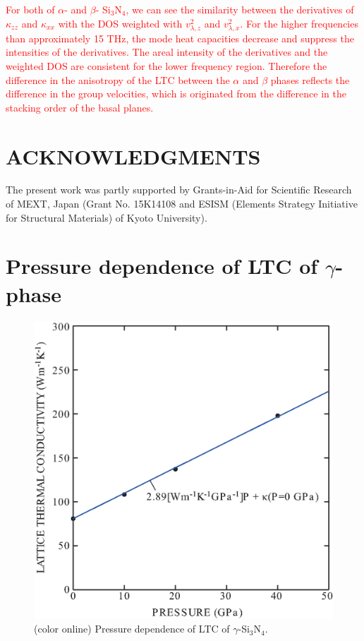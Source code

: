 \documentclass[twocolumn,amsmath,amssymb,a4paper,prb,superscriptaddress,floatfix]{revtex4-1}
\begin{document}
\textcolor{red}{For both of $\alpha$- and $\beta$- Si$_3$N$_4$, we can
see the similarity between the derivatives of $\kappa_{zz}$ and
$\kappa_{xx}$ with the DOS weighted with $v_{\lambda,z}^2$ and
$v_{\lambda,x}^2$. For the higher frequencies than approximately 15 THz,
the mode heat capacities decrease and suppress the intensities of the
derivatives. The areal intensity of the derivatives and the weighted DOS
are consistent for the lower frequency region. Therefore the difference
in the anisotropy of the LTC between the $\alpha$ and $\beta$ phases
reflects the difference in the group velocities, which is originated
from the difference in the stacking order of the basal planes.}

\section*{ACKNOWLEDGMENTS}
The present work was partly supported by Grants-in-Aid for Scientific
Research of MEXT, Japan (Grant No. 15K14108 and ESISM (Elements Strategy
Initiative for Structural Materials) of Kyoto University).

\appendix
\section{Pressure dependence of LTC of $\gamma$-phase}
\begin{figure}[ht]
 \begin{center}
  \includegraphics[width=0.80\linewidth]{S1.eps} \caption{(color online)
  Pressure dependence of LTC of $\gamma$-Si$_3$N$_4$.  \label{fig:S1} }
 \end{center}
\end{figure}



\end{document}
